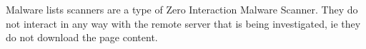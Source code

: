 Malware lists scanners are a type of Zero Interaction Malware Scanner. They do not interact in any way with the remote server that is being investigated, ie they do not download the page content.

\begin{comment}
* into/malware type
* APIs used
    * WOT
    * Alexa
* Alexa
    * celery beat ZIP download
* WOT
    * API requirements
    * batch process, return items
    * URL < 8Kio, <100
\end{comment}